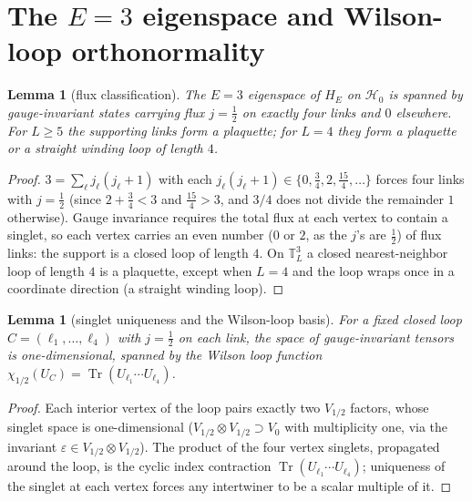 \documentclass[11pt]{article}
\newtheorem{lemma}[theorem]{Lemma}
\newcommand{\Tr}{\operatorname{Tr}}
\begin{document}
\section{The $E=3$ eigenspace and Wilson-loop orthonormality}\label{sec:E3}
\begin{lemma}[flux classification]\label{lem:flux}
The $E=3$ eigenspace of $H_E$ on $\mathcal H_0$ is spanned by gauge-invariant
states carrying flux $j=\tfrac12$ on exactly four links and $0$ elsewhere.
For $L\ge 5$ the supporting links form a plaquette; for $L=4$ they form a
plaquette or a straight winding loop of length $4$.
\end{lemma}
\begin{proof}
$3=\sum_\ell j_\ell(j_\ell+1)$ with each $j_\ell(j_\ell+1)\in\{0,\tfrac34,2,
\tfrac{15}{4},\dots\}$ forces four links with $j=\tfrac12$ (since
$2+\tfrac34<3$ and $\tfrac{15}4>3$, and $3/4$ does not divide the remainder
$1$ otherwise). Gauge invariance requires the total flux at each vertex to
contain a singlet, so each vertex carries an even number ($0$ or $2$, as the
$j$'s are $\tfrac12$) of flux links: the support is a closed loop of length
$4$. On $\mathbb T_L^3$ a closed nearest-neighbor loop of length $4$ is a
plaquette, except when $L=4$ and the loop wraps once in a coordinate
direction (a straight winding loop).
\end{proof}

\begin{lemma}[singlet uniqueness and the Wilson-loop basis]\label{lem:singlet}
For a fixed closed loop $C=(\ell_1,\dots,\ell_4)$ with $j=\tfrac12$ on each
link, the space of gauge-invariant tensors is one-dimensional, spanned by
the Wilson loop function $\chi_{1/2}(U_C)=\Tr(U_{\ell_1}\cdots U_{\ell_4})$.
\end{lemma}
\begin{proof}
Each interior vertex of the loop pairs exactly two $V_{1/2}$ factors, whose
singlet space is one-dimensional ($V_{1/2}\otimes V_{1/2}\supset V_0$ with
multiplicity one, via the invariant $\varepsilon\in V_{1/2}\otimes V_{1/2}$).
The product of the four vertex singlets, propagated around the loop, is the
cyclic index contraction $\Tr(U_{\ell_1}\cdots U_{\ell_4})$; uniqueness of
the singlet at each vertex forces any intertwiner to be a scalar multiple of
it.
\end{proof}
\end{document}
